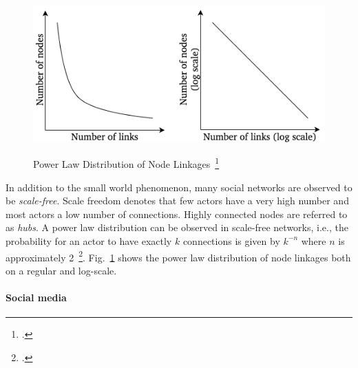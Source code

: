\begin{figure}[h]
  \includegraphics[height=6cm]{img/power_law_linkages}
  \caption[Power Law Distribution of Node Linkages]{Power Law Distribution of Node Linkages~\footcite{Barabasi2003}}
\label{fig:power_law}
\end{figure}

In addition to the small world phenomenon, many social networks are observed to
be \textit{scale-free}.
Scale freedom denotes that few actors have a very high number and most actors 
a low number of connections.
Highly connected nodes are referred to as \textit{hubs}.
A power law distribution can be observed in scale-free networks, i.e., the
probability for an actor to have exactly $k$ connections is given by $k^{-n}$
where $n$ is approximately 2~\footcite{Barabasi2003}.
Fig.~\ref{fig:power_law} shows the power law distribution of node linkages both
on a regular and log-scale.

\paragraph{Social media}
\label{sub:sn_social_media}

